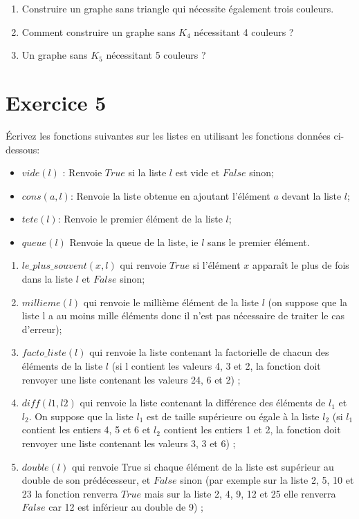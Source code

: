 \documentclass{article}[12pt]
\begin{document}
\begin{enumerate}
    \item Construire un graphe sans triangle qui nécessite également trois couleurs.
    \item Comment construire un graphe sans $K_4$ nécessitant 4 couleurs ?
    \item Un graphe sans $K_5$ nécessitant 5 couleurs ?
\end{enumerate}



\section*{Exercice 5}
Écrivez les fonctions suivantes sur les listes en utilisant les fonctions données ci-dessous:

\begin{itemize}
    \item $vide(l)$ : Renvoie $True$ si la liste $l$ est vide et $False$ sinon;
    \item $cons(a,l)$: Renvoie la liste obtenue en ajoutant l'élément $a$ devant la liste $l$;
    \item $tete(l)$: Renvoie le premier élément de la liste $l$;
    \item $queue(l)$ Renvoie la queue de la liste, ie $l$ sans le premier élément.
\end{itemize}


\begin{enumerate}
    \item $le\_plus\_souvent(x,l)$ qui renvoie $True$ si l’élément $x$ apparaît le plus de fois dans la liste $l$ et $False$ sinon;
    \item $millieme(l)$ qui renvoie le millième élément de la liste $l$ (on suppose que la liste l a au moins
mille éléments donc il n’est pas nécessaire de traiter le cas d’erreur);
    \item $facto\_liste(l)$ qui renvoie la liste contenant la factorielle de chacun des éléments de la liste $l$
(si l contient les valeurs 4, 3 et 2, la fonction doit renvoyer une liste contenant les valeurs 24, 6 et
2) ;
    \item $diff(l1,l2)$ qui renvoie la liste contenant la différence des éléments de $l_1$ et $l_2$. On suppose que la liste $l_1$ est de taille supérieure ou égale à la liste $l_2$ (si $l_1$ contient les entiers 4, 5 et 6 et $l_2$ contient les entiers 1 et 2, la fonction doit renvoyer une liste contenant les valeurs 3, 3 et 6) ;
    \item $double(l)$ qui renvoie True si chaque élément de la liste est supérieur au double de son prédécesseur, et $False$ sinon (par exemple sur la liste 2, 5, 10 et 23 la fonction renverra $True$ mais sur la liste 2, 4, 9, 12 et 25 elle renverra $False$ car 12 est inférieur au double de 9) ;

\end{enumerate}
\end{document}
